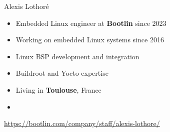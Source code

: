 \begin{frame}{Alexis Lothoré}
  \begin{itemize}
  \item Embedded Linux engineer at {\bf Bootlin} since 2023
  \item Working on embedded Linux systems since 2016
  \item Linux BSP development and integration
  \item Buildroot and Yocto expertise
  \item Living in {\bf Toulouse}, France
  \item {}
  \end{itemize}
  {\small \url{https://bootlin.com/company/staff/alexis-lothore/}}
\end{frame}

